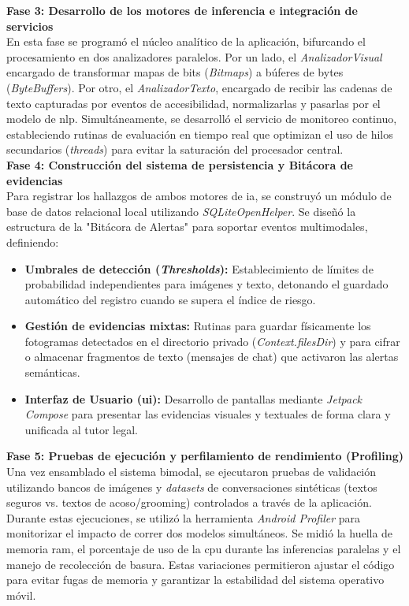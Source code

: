 \textbf{Fase 3: Desarrollo de los motores de inferencia e integración de servicios} \\
En esta fase se programó el núcleo analítico de la aplicación, bifurcando el procesamiento en dos analizadores paralelos. Por un lado, el \textit{AnalizadorVisual} encargado de transformar mapas de bits (\textit{Bitmaps}) a búferes de bytes (\textit{ByteBuffers}). Por otro, el \textit{AnalizadorTexto}, encargado de recibir las cadenas de texto capturadas por eventos de accesibilidad, normalizarlas y pasarlas por el modelo de \gls{nlp}. Simultáneamente, se desarrolló el servicio de monitoreo continuo, estableciendo rutinas de evaluación en tiempo real que optimizan el uso de hilos secundarios (\textit{threads}) para evitar la saturación del procesador central. \\

\textbf{Fase 4: Construcción del sistema de persistencia y Bitácora de evidencias} \\
Para registrar los hallazgos de ambos motores de \gls{ia}, se construyó un módulo de base de datos relacional local utilizando \textit{SQLiteOpenHelper}. Se diseñó la estructura de la "Bitácora de Alertas" para soportar eventos multimodales, definiendo:

\begin{itemize}
    \item \textbf{Umbrales de detección (\textit{Thresholds}):} Establecimiento de límites de probabilidad independientes para imágenes y texto, detonando el guardado automático del registro cuando se supera el índice de riesgo.
    \item \textbf{Gestión de evidencias mixtas:} Rutinas para guardar físicamente los fotogramas detectados en el directorio privado (\textit{Context.filesDir}) y para cifrar o almacenar fragmentos de texto (mensajes de chat) que activaron las alertas semánticas.
    \item \textbf{Interfaz de Usuario (\gls{ui}):} Desarrollo de pantallas mediante \textit{Jetpack Compose} para presentar las evidencias visuales y textuales de forma clara y unificada al tutor legal.
\end{itemize}

\textbf{Fase 5: Pruebas de ejecución y perfilamiento de rendimiento (Profiling)} \\
Una vez ensamblado el sistema bimodal, se ejecutaron pruebas de validación utilizando bancos de imágenes y \textit{datasets} de conversaciones sintéticas (textos seguros vs. textos de acoso/grooming) controlados a través de la aplicación. Durante estas ejecuciones, se utilizó la herramienta \textit{Android Profiler} para monitorizar el impacto de correr dos modelos simultáneos. Se midió la huella de memoria \gls{ram}, el porcentaje de uso de la \gls{cpu} durante las inferencias paralelas y el manejo de recolección de basura. Estas variaciones permitieron ajustar el código para evitar fugas de memoria y garantizar la estabilidad del sistema operativo móvil. \\

